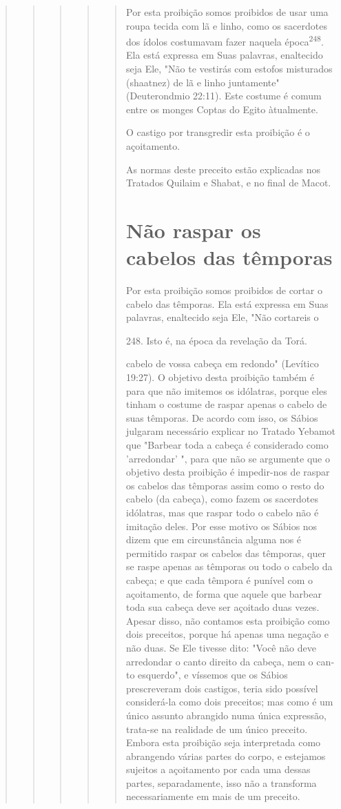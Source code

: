 \begin{quote}
\begin{quote}
\begin{quote}
\begin{quote}
\begin{quote}
Por esta proibição somos proibidos de usar uma roupa tecida com lã e
linho, como os sacerdotes dos ídolos costumavam fazer naquela
época\textsuperscript{248}. Ela está expressa em Suas palavras,
enaltecido seja Ele, "Não te vestirás com estofos misturados (shaatnez)
de lã e linho juntamente" (Deuterondmio 22:11). Este costume é comum
entre os monges Coptas do Egito àtualmente.

O castigo por transgredir esta proibição é o açoitamento.

As normas deste preceito estão explicadas nos Tratados Quilaim e Shabat,
e no final de Macot.

\section{Não raspar os cabelos das têmporas}

Por esta proibição somos proibidos de cortar o cabelo das têmpo­ras. Ela
está expressa em Suas palavras, enaltecido seja Ele, "Não cortareis o

248. Isto é, na época da revelação da Torá.

cabelo de vossa cabeça em redondo" (Levítico 19:27). O objetivo desta
proibi­ção também é para que não imitemos os idólatras, porque eles
tinham o costu­me de raspar apenas o cabelo de suas têmporas. De acordo
com isso, os Sábios julgaram necessário explicar no Tratado Yebamot que
"Barbear toda a cabeça é considerado como 'arredondar' ", para que não
se argumente que o objetivo desta proibição é impedir-nos de raspar os
cabelos das têmporas assim como o resto do cabelo (da cabeça), como
fazem os sacerdotes idólatras, mas que ras­par todo o cabelo não é
imitação deles. Por esse motivo os Sábios nos dizem que em circunstância
alguma nos é permitido raspar os cabelos das têmporas, quer se raspe
apenas as têmporas ou todo o cabelo da cabeça; e que cada têm­pora é
punível com o açoitamento, de forma que aquele que barbear toda sua
cabeça deve ser açoitado duas vezes. Apesar disso, não contamos esta
proibi­ção como dois preceitos, porque há apenas uma negação e não duas.
Se Ele tivesse dito: "Você não deve arredondar o canto direito da
cabeça, nem o can­to esquerdo", e víssemos que os Sábios prescreveram
dois castigos, teria sido possível considerá-la como dois preceitos; mas
como é um único assunto abran­gido numa única expressão, trata-se na
realidade de um único preceito. Embo­ra esta proibição seja interpretada
como abrangendo várias partes do corpo, e estejamos sujeitos a
açoitamento por cada uma dessas partes, separadamente, isso não a
transforma necessariamente em mais de um preceito.


\end{quote}
\end{quote}
\end{quote}
\end{quote}
\end{quote}

